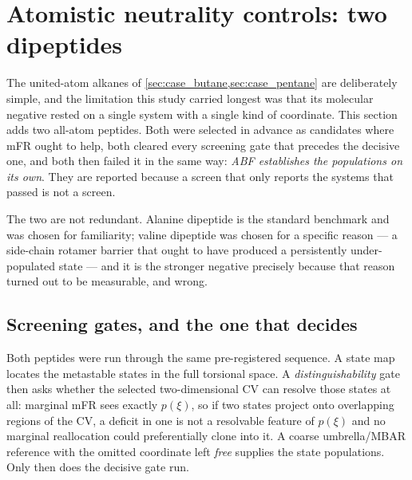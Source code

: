 \section{Atomistic neutrality controls: two dipeptides}
\label{sec:neutrality}

The united-atom alkanes of \cref{sec:case_butane,sec:case_pentane} are deliberately simple,
and the limitation this study carried longest was that its molecular negative rested on a
single system with a single kind of coordinate. This section adds two all-atom peptides.
Both were selected in advance as candidates where mFR ought to help, both cleared every
screening gate that precedes the decisive one, and both then failed it in the same way:
\emph{ABF establishes the populations on its own}. They are reported because a screen that
only reports the systems that passed is not a screen.

The two are not redundant. Alanine dipeptide is the standard benchmark and was chosen for
familiarity; valine dipeptide was chosen for a specific reason --- a side-chain rotamer
barrier that ought to have produced a persistently under-populated state --- and it is the
stronger negative precisely because that reason turned out to be measurable, and wrong.

\subsection{Screening gates, and the one that decides}
\label{sec:neutrality_gates}
Both peptides were run through the same pre-registered sequence. A state map locates the
metastable states in the full torsional space. A \emph{distinguishability} gate then asks
whether the selected two-dimensional CV can resolve those states at all: marginal mFR sees
exactly $p(\xi)$, so if two states project onto overlapping regions of the CV, a deficit in
one is not a resolvable feature of $p(\xi)$ and no marginal reallocation could preferentially
clone into it. A coarse umbrella/MBAR reference with the omitted coordinate left \emph{free}
supplies the state populations. Only then does the decisive gate run.

